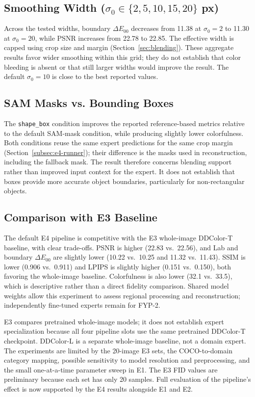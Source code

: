 \documentclass{FastFyp}
\begin{document}
\subsection{Smoothing Width (\texorpdfstring{$\sigma_0 \in \{2, 5, 10, 15, 20\}$}{sigma0 = 2, 5, 10, 15, 20} px)}
Across the tested widths, boundary $\Delta E_{00}$ decreases from 11.38 at $\sigma_0=2$ to 11.30 at $\sigma_0=20$, while PSNR increases from 22.78 to 22.85. The effective width is capped using crop size and margin (Section~\ref{sec:blending}). These aggregate results favor wider smoothing within this grid; they do not establish that color bleeding is absent or that still larger widths would improve the result. The default $\sigma_0=10$ is close to the best reported values.

\subsection{SAM Masks vs. Bounding Boxes}
The \texttt{shape\_box} condition improves the reported reference-based metrics relative to the default SAM-mask condition, while producing slightly lower colorfulness. Both conditions reuse the same expert predictions for the same crop margin (Section~\ref{subsec:e4-runner}); their difference is the masks used in reconstruction, including the fallback mask. The result therefore concerns blending support rather than improved input context for the expert. It does not establish that boxes provide more accurate object boundaries, particularly for non-rectangular objects.

\subsection{Comparison with E3 Baseline}
The default E4 pipeline is competitive with the E3 whole-image DDColor-T baseline, with clear trade-offs. PSNR is higher (22.83 vs.\ 22.56), and Lab and boundary $\Delta E_{00}$ are slightly lower (10.22 vs.\ 10.25 and 11.32 vs.\ 11.43). SSIM is lower (0.906 vs.\ 0.911) and LPIPS is slightly higher (0.151 vs.\ 0.150), both favoring the whole-image baseline. Colorfulness is also lower (32.1 vs.\ 33.5), which is descriptive rather than a direct fidelity comparison. Shared model weights allow this experiment to assess regional processing and reconstruction; independently fine-tuned experts remain for FYP-2.

E3 compares pretrained whole-image models; it does not establish expert
specialization because all four pipeline slots use the same pretrained
DDColor-T checkpoint. DDColor-L is a separate whole-image baseline, not a
domain expert. The experiments are limited by the 20-image E3 sets, the
COCO-to-domain category mapping, possible sensitivity to model resolution and
preprocessing, and the small one-at-a-time parameter sweep in E1. The E3 FID
values are preliminary because each set has only 20 samples. Full evaluation
of the pipeline's effect is now supported by the E4 results alongside E1
and E2.
\end{document}
